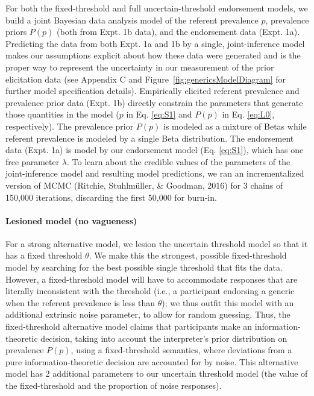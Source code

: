 \documentclass[english,,man,floatsintext]{apa6}
\let\oldparagraph\paragraph
\renewcommand{\paragraph}[1]{\oldparagraph{#1}\mbox{}}
\theoremstyle{definition}
\theoremstyle{definition}
\theoremstyle{definition}
\theoremstyle{remark}
\begin{document}
For both the fixed-threshold and full uncertain-threshold endorsement
models, we build a joint Bayesian data analysis model of the referent
prevalence \(p\), prevalence priors \(P(p)\) (both from Expt. 1b data),
and the endorsement data (Expt. 1a). Predicting the data from both Expt.
1a and 1b by a single, joint-inference model makes our assumptions
explicit about how these data were generated and is the proper way to
represent the uncertainty in our measurement of the prior elicitation
data (see Appendix C and Figure~\ref{fig:genericsModelDiagram} for
further model specification details). Empirically elicited referent
prevalence and prevalence prior data (Expt. 1b) directly constrain the
parameters that generate those quantities in the model (\(p\) in Eq.
\ref{eq:S1} and \(P(p)\) in Eq. \ref{eq:L0}, respectively). The
prevalence prior \(P(p)\) is modeled as a mixture of Betas while
referent prevalence is modeled by a single Beta distribution. The
endorsement data (Expt. 1a) is model by our endorsement model (Eq.
\ref{eq:S1}), which has one free parameter \(\lambda\). To learn about
the credible values of the parameters of the joint-inference model and
resulting model predictions, we ran an incrementalized version of MCMC
(Ritchie, Stuhlmüller, \& Goodman, 2016) for 3 chains of 150,000
iterations, discarding the first 50,000 for burn-in.

\hypertarget{lesioned-model-no-vagueness}{%
\paragraph{Lesioned model (no
vagueness)}\label{lesioned-model-no-vagueness}}

For a strong alternative model, we lesion the uncertain threshold model
so that it has a fixed threshold \(\theta\). We make this the strongest,
possible fixed-threshold model by searching for the best possible single
threshold that fits the data. However, a fixed-threshold model will have
to accommodate responses that are literally inconsistent with the
threshold (i.e., a participant endorsing a generic when the referent
prevalence is less than \(\theta\)); we thus outfit this model with an
additional extrinsic noise parameter, to allow for random guessing.
Thus, the fixed-threshold alternative model claims that participants
make an information-theoretic decision, taking into account the
interpreter's prior distribution on prevalence \(P(p)\), using a
fixed-threshold semantics, where deviations from a pure
information-theoretic decision are accounted for by noise. This
alternative model has 2 additional parameters to our uncertain threshold
model (the value of the fixed-threshold and the proportion of noise
responses).
\end{document}
